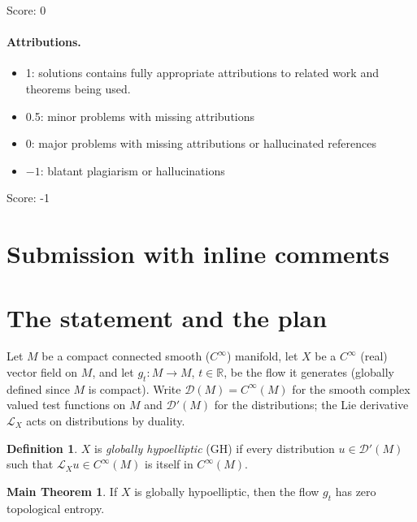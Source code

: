 \documentclass[11pt]{article}
\theoremstyle{definition}
\newtheorem{definition}[theorem]{Definition}
\newtheorem*{mainthm}{Main Theorem}
\newcommand{\calL}{\mathcal{L}}
\newcommand{\RR}{\mathbb{R}}
\begin{document}
\noindent Score: 0

\paragraph{Attributions.}
\begin{itemize}
	\item  1: solutions contains fully appropriate attributions
		to related work and theorems being used.
	\item  0.5: minor problems with missing attributions
	\item  0: major problems with missing attributions or hallucinated
		 references
	\item  $-1$: blatant plagiarism or hallucinations
\end{itemize}

\noindent Score: -1

\newpage
\section{Submission with inline comments}


\section{The statement and the plan}\label{sec:intro}

Let $M$ be a compact connected smooth ($C^\infty$) manifold, let $X$ be a
$C^\infty$ (real) vector field on $M$, and let $g_t : M \to M$,
$t \in \RR$, be the flow it generates (globally defined since $M$ is
compact). Write $\mathcal{D}(M) = C^\infty(M)$ for the smooth complex
valued test functions on $M$ and $\mathcal{D}'(M)$ for the distributions;
the Lie derivative $\calL_X$ acts on distributions by duality.

\begin{definition}\label{def:GH}
$X$ is \emph{globally hypoelliptic} (GH) if every distribution
$u \in \mathcal{D}'(M)$ such that $\calL_X u \in C^\infty(M)$ is itself in
$C^\infty(M)$.
\end{definition}

\begin{mainthm}
If $X$ is globally hypoelliptic, then the flow $g_t$ has zero topological
entropy.
\end{mainthm}
\end{document}
